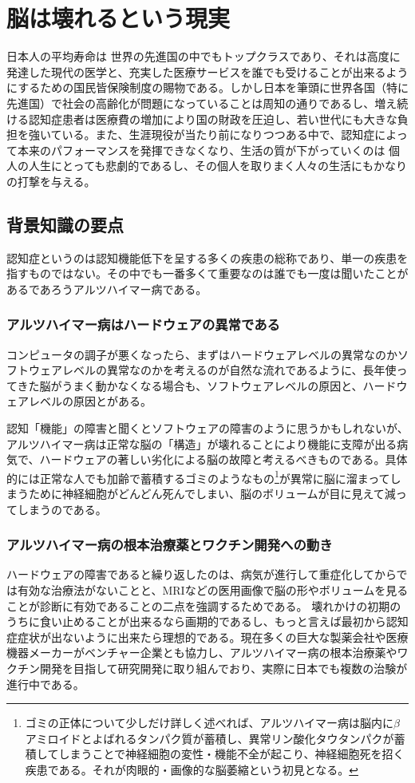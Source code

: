 \section{脳は壊れるという現実}
日本人の平均寿命は
世界の先進国の中でもトップクラスであり、それは高度に発達した現代の医学と、充実した医療サービスを誰でも受けることが出来るようにするための国民皆保険制度の賜物である。しかし日本を筆頭に世界各国（特に先進国）で社会の高齢化が問題になっていることは周知の通りであるし、増え続ける認知症患者は医療費の増加により国の財政を圧迫し、若い世代にも大きな負担を強いている。また、生涯現役が当たり前になりつつある中で、認知症によって本来のパフォーマンスを発揮できなくなり、生活の質が下がっていくのは
個人の人生にとっても悲劇的であるし、その個人を取りまく人々の生活にもかなりの打撃を与える。

\subsection{背景知識の要点}
認知症というのは認知機能低下を呈する多くの疾患の総称であり、単一の疾患を指すものではない。その中でも一番多くて重要なのは誰でも一度は聞いたことがあるであろうアルツハイマー病である。

\subsubsection{アルツハイマー病はハードウェアの異常である}
コンピュータの調子が悪くなったら、まずはハードウェアレベルの異常なのかソフトウェアレベルの異常なのかを考えるのが自然な流れであるように、長年使ってきた脳がうまく動かなくなる場合も、ソフトウェアレベルの原因と、ハードウェアレベルの原因とがある。

認知「機能」の障害と聞くとソフトウェアの障害のように思うかもしれないが、アルツハイマー病は正常な脳の「構造」が壊れることにより機能に支障が出る病気で、ハードウェアの著しい劣化による脳の故障と考えるべきものである。具体的には正常な人でも加齢で蓄積するゴミのようなもの\footnote{ゴミの正体について少しだけ詳しく述べれば、アルツハイマー病は脳内に$\beta$アミロイドとよばれるタンパク質が蓄積し、異常リン酸化タウタンパクが蓄積してしまうことで神経細胞の変性・機能不全が起こり、神経細胞死を招く疾患である。それが肉眼的・画像的な脳萎縮という初見となる。}が異常に脳に溜まってしまうために神経細胞がどんどん死んでしまい、脳のボリュームが目に見えて減ってしまうのである。

\subsubsection{アルツハイマー病の根本治療薬とワクチン開発への動き}
ハードウェアの障害であると繰り返したのは、病気が進行して重症化してからでは有効な治療法がないことと、MRIなどの医用画像で脳の形やボリュームを見ることが診断に有効であることの二点を強調するためである。
壊れかけの初期のうちに食い止めることが出来るなら画期的であるし、もっと言えば最初から認知症症状が出ないように出来たら理想的である。現在多くの巨大な製薬会社や医療機器メーカーがベンチャー企業とも協力し、アルツハイマー病の根本治療薬やワクチン開発を目指して研究開発に取り組んでおり、実際に日本でも複数の治験が進行中である。

